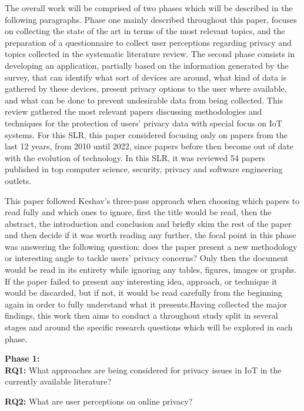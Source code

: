 \documentclass[conference]{IEEEtran}
\begin{document}
The overall work will be comprised of two phases which will be described in
the following paragraphs. Phase one mainly described throughout this paper,
focuses on collecting the state of the art in terms of the most relevant topics,
and the preparation of a questionnaire to collect user perceptions regarding
privacy and topics collected in the systematic literature review.
The second phase consists in developing an application, partially
based on the information generated by the survey, that can identify what sort
of devices are around, what kind of data is gathered by these devices, present
privacy options to the user where available, and what can be done to prevent
undesirable data from being collected.
This review gathered the most relevant papers discussing methodologies and techniques for
the protection of users' privacy data with special focus on IoT systems. For
this SLR, this paper considered focusing only on papers from the last 12 years,
from 2010 until 2022, since papers before then become out of date with the
evolution of technology. In this SLR, it was reviewed 54
papers published in top computer science, security, privacy and software
engineering outlets.

This paper followed Keshav's three-pass approach \cite{KeshavHow} when choosing
which papers to read fully and which ones to ignore, first the title would
be read, then the abstract, the introduction and conclusion and briefly skim
the rest of the paper and then decide if it was worth reading any further,
the focal point in this phase was answering the following question: does
the paper present a new methodology or interesting angle to tackle users'
privacy concerns? Only then the document would be read in its entirety while
ignoring any tables, figures, images or graphs. If the paper failed to present
any interesting idea, approach, or technique it would be discarded, but if
not, it would be read carefully from the beginning again in order to fully
understand what it presents.Having collected the major findings, this work then aims to conduct a throughout
study split in several stages and around the specific research questions which will be explored in each phase.

\vspace{5mm}
\textbf{Phase 1:} \\

\textbf{RQ1:} What approaches are being considered for privacy issues in
IoT in the currently available literature?

\textbf{RQ2:} What are user perceptions on online privacy? \\
\end{document}
